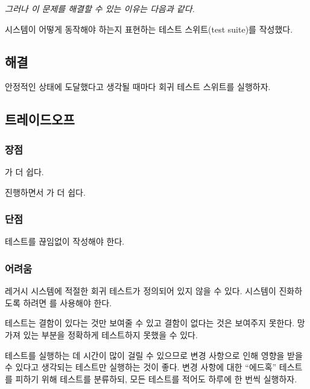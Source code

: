 \documentclass[a4paper,10pt,twoside]{book}
\begin{document}
\emph{그러나 이 문제를 해결할 수 있는 이유는 다음과 같다.}

\begin{bulletlist}
\item 시스템이 어떻게 동작해야 하는지 표현하는 테스트 스위트(test suite)를 작성했다.
\end{bulletlist}

\subsection*{해결}

안정적인 상태에 도달했다고 생각될 때마다 회귀 테스트 스위트를 실행하자.

\subsection*{트레이드오프}

\subsubsection*{장점}

\begin{bulletlist}
\item {}가 더 쉽다.

\item 진행하면서 가 더 쉽다.
\end{bulletlist}

\subsubsection*{단점}

\begin{bulletlist}
\item 테스트를 끊임없이 작성해야 한다. 
\end{bulletlist}

\subsubsection*{어려움}

\begin{bulletlist}
\item 레거시 시스템에 적절한 회귀 테스트가 정의되어 있지 않을 수 있다. 시스템이 진화하도록 하려면 를 사용해야 한다.

\item 테스트는 결함이 있다는 것만 보여줄 수 있고 결함이 없다는 것은 보여주지 못한다. 망가져 있는 부분을 정확하게 테스트하지 못했을 수 있다.

\item 테스트를 실행하는 데 시간이 많이 걸릴 수 있으므로 변경 사항으로 인해 영향을 받을 수 있다고 생각되는 테스트만 실행하는 것이 좋다. 변경 사항에 대한 ``에드혹'' 테스트를 피하기 위해 테스트를 분류하되, 모든 테스트를 적어도 하루에 한 번씩 실행하자.
\end{bulletlist}
\end{document}
